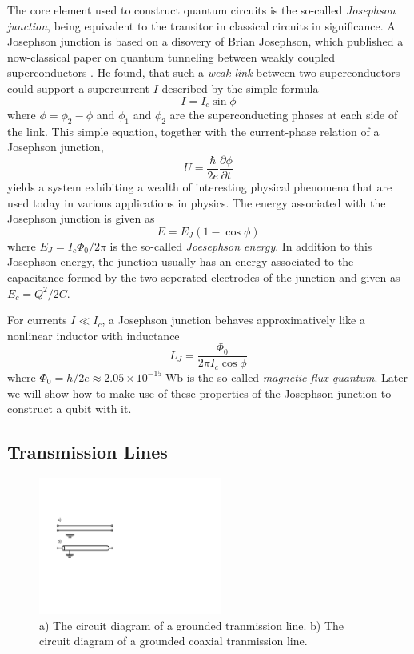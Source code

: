 The core element used to construct quantum circuits is the so-called {\it Josephson junction}, being equivalent to the transitor in classical circuits in significance. A Josephson junction is based on a disovery of Brian Josephson, which published a now-classical paper on quantum tunneling between weakly coupled superconductors \citep{josephson_possible_1962}. He found, that such a {\it weak link} between two superconductors could support a supercurrent $I$ described by the simple formula
%
\begin{equation}
I = I_c\sin{\phi}
\end{equation}
%
where $\phi = \phi_2-\phi$ and $\phi_1$ and $\phi_2$ are the superconducting phases at each side of the link. This simple equation, together with the current-phase relation of a Josephson junction,
%
\begin{equation}
U = \frac{\hbar}{2e}\frac{\partial \phi}{\partial t}
\end{equation}
%
yields a system exhibiting a  wealth of interesting physical phenomena that are used today in various applications in physics. The energy associated with the Josephson junction is given as
%
\begin{equation}
E = E_J(1-\cos{\phi})
\end{equation}
%
where $E_J = I_c \Phi_0/2\pi$ is the so-called {\it Joesephson energy}. In addition to this Josephson energy, the junction usually has an energy associated to the capacitance formed by the two seperated electrodes of the junction and given as $E_c = Q^2/2C$. 

\smallskip

For currents $I\ll I_c$, a Josephson junction behaves approximatively like a nonlinear inductor with inductance 
%
\begin{equation}
L_J = \frac{\Phi_0}{2\pi I_c \cos{\phi}} \label{eq:josephson_inductance}
\end{equation}
%
where $\Phi_0 = h/2e \approx 2.05 \times 10^{-15}\; \mathrm{Wb}$ is the so-called {\it magnetic flux quantum}. Later we will show how to make use of these properties of the Josephson junction to construct a qubit with it.

\subsection{Transmission Lines}

\begin{figure}
	\includegraphics[width=6cm]{"./material/figures/introduction/transmission_lines"}
	\caption{a) The circuit diagram of a grounded tranmission line. b) The circuit diagram of a grounded coaxial tranmission line.}
	\label{fig:tline_schematic}
\end{figure}

